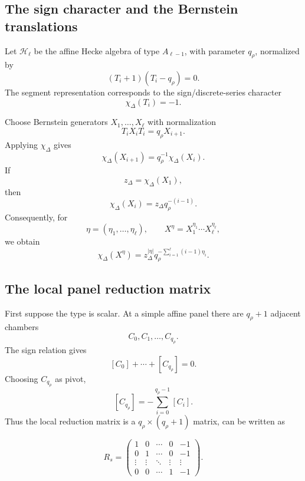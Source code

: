 \documentclass[12pt]{article}
\theoremstyle{definition}
\theoremstyle{remark}
\begin{document}
\subsection{The sign character and the Bernstein translations}

Let \(\mathcal H_\ell\) be the affine Hecke algebra of type
\(A_{\ell-1}\), with parameter \(q_\rho\), normalized by
\[
 (T_i+1)(T_i-q_\rho)=0.
\]
The segment representation corresponds to the sign/discrete-series character
\[
 \chi_\Delta(T_i)=-1.
\]

Choose Bernstein generators \(X_1,\ldots,X_\ell\) with normalization
\begin{equation}\label{eq:Bernstein-X-relation-one-segment}
 T_iX_iT_i=q_\rho X_{i+1}.
\end{equation}
Applying \(\chi_\Delta\) gives
\[
 \chi_\Delta(X_{i+1})
 =
 q_\rho^{-1}\chi_\Delta(X_i).
\]
If
\[
 z_\Delta=\chi_\Delta(X_1),
\]
then
\begin{equation}\label{eq:segment-translation-character}
 \boxed{
 \chi_\Delta(X_i)
 =
 z_\Delta q_\rho^{-(i-1)}.
 }
\end{equation}
Consequently, for
\[
 \eta=(\eta_1,\ldots,\eta_\ell),
 \qquad
 X^\eta=X_1^{\eta_1}\cdots X_\ell^{\eta_\ell},
\]
we obtain
\begin{equation}\label{eq:segment-translation-character-general}
 \boxed{
 \chi_\Delta(X^\eta)
 =
 z_\Delta^{|\eta|}
 q_\rho^{-\sum_{i=1}^{\ell}(i-1)\eta_i}.
 }
\end{equation}

\subsection{The local panel reduction matrix}

First suppose the type is scalar.  At a simple affine panel there are
\(q_\rho+1\) adjacent chambers
\[
 C_0,C_1,\ldots,C_{q_\rho}.
\]
The sign relation gives
\begin{equation}\label{eq:panel-sign-relation}
 [C_0]+\cdots+[C_{q_\rho}]=0.
\end{equation}
Choosing \(C_{q_\rho}\) as pivot,
\[
 [C_{q_\rho}]
 =
 -\sum_{i=0}^{q_\rho-1}[C_i].
\]
Thus the local reduction matrix is a $q_\rho\times(q_\rho+1)$ matrix, can be written as

\begin{equation}\label{eq:local-R-scalar}
R_s=
	\begin{pmatrix}
		1 & 0 & \cdots & 0 & -1\\
		0 & 1 & \cdots & 0  & -1\\
		\vdots & \vdots & \ddots & \vdots & \vdots \\
		0 & 0 & \cdots & 1 & -1
	\end{pmatrix}.
\end{equation}
\end{document}
